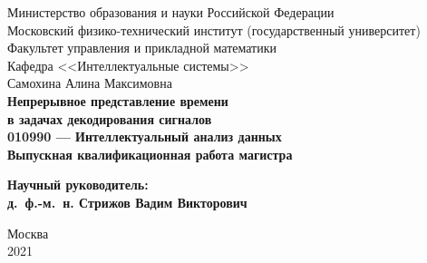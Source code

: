\documentclass[12pt]{article}
\begin{document}
\thispagestyle{empty}
\begin{center}
    \sc
        Министерство образования и науки Российской Федерации\\
        Московский физико-технический институт
        {\rm(государственный университет)}\\
        Факультет управления и прикладной математики\\
        Кафедра <<Интеллектуальные системы>>\\[35mm]
    \rm\large
        Самохина Алина Максимовна\\[10mm]
    \bf\Large
	Непрерывное представление времени\\ в задачах декодирования сигналов \\[10mm]
    \rm\normalsize
        010990 --- Интеллектуальный анализ данных\\[10mm]
    \sc
        Выпускная квалификационная работа магистра\\[10mm]
\end{center}
\hfill\parbox{80mm}{
    \begin{flushleft}
    \bf
        Научный руководитель:\\
    \rm
        д.~ф.-м.~н. Стрижов Вадим Викторович\\[5cm]
    \end{flushleft}
}
\begin{center}
    Москва\\
    2021
\end{center}


\newpage
\tableofcontents
\newpage
\end{document}
